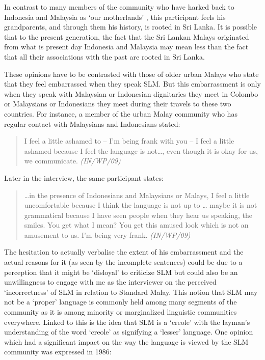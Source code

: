 In contrast to many members of the community who have harked back to Indonesia and Malaysia as `our motherlands' \citep[5]{Thaliph1998}, this participant feels his grandparents, and through them his history, is rooted in Sri Lanka. It is possible that to the present generation, the fact that the Sri Lankan Malays originated from what is present day Indonesia and Malaysia may mean less than the fact that all their associations with the past are rooted in Sri Lanka.

These opinions have to be contrasted with those of older urban Malays who state that they feel embarrassed when they speak SLM. But this embarrassment is only when they speak with Malaysian or Indonesian dignitaries they meet in Colombo or Malaysians or Indonesians they meet during their travels to these two countries. For instance, a member of the urban Malay community who has regular contact with Malaysians and Indonesians stated:

\begin{quote} 
I feel a little ashamed to -- I'm being frank with you -- I feel a little ashamed because I feel the language is not{\dots}, even though it is okay for us, we communicate.
{\itshape  (IN/WP/09)}
\end{quote}

Later in the interview, the same participant states:

\begin{quote}
\dots in the presence of Indonesians and Malaysians or Malays, I feel a little uncomfortable because I think the language is not up to {\dots} maybe it is not grammatical because I have seen people when they hear us speaking, the smiles. You get what I mean? You get this amused look which is not an amusement to us. I'm being very frank.
{\itshape (IN/WP/09)}
\end{quote}

The hesitation to actually verbalise the extent of his embarrassment and the actual reasons for it (as seen by the incomplete sentences) could be due to a perception that it might be `disloyal' to criticize SLM but could also be an unwillingness to engage with me as the interviewer on the perceived `incorrectness' of SLM in relation to Standard Malay. This notion that SLM may not be a `proper' language is commonly held among many segments of the community as it is among minority or marginalized linguistic communities everywhere. Linked to this is the idea that SLM is a `creole' with the layman's understanding of the word `creole' as signifying a `lesser' language.  One opinion which had a significant impact on the way the language is viewed by the SLM community was expressed in 1986: 

